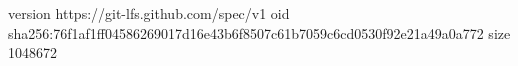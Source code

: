 version https://git-lfs.github.com/spec/v1
oid sha256:76f1af1ff04586269017d16e43b6f8507c61b7059c6cd0530f92e21a49a0a772
size 1048672
